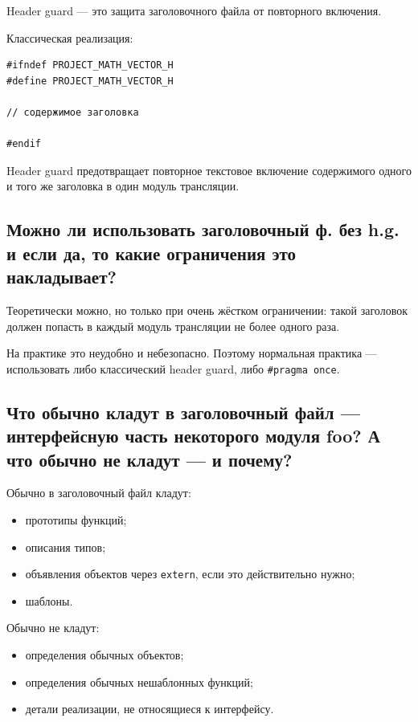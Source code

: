 \begin{definition}
Header guard --- это защита заголовочного файла от повторного включения.
\end{definition}

Классическая реализация:
\begin{verbatim}
#ifndef PROJECT_MATH_VECTOR_H
#define PROJECT_MATH_VECTOR_H

// содержимое заголовка

#endif
\end{verbatim}

Header guard предотвращает повторное текстовое включение содержимого одного и того же заголовка в один модуль трансляции.


\subsection{Можно ли использовать заголовочный ф. без h.g. и если да, то какие ограничения это накладывает?}

Теоретически можно, но только при очень жёстком ограничении: такой заголовок должен попасть в каждый модуль трансляции не более одного раза.

На практике это неудобно и небезопасно. Поэтому нормальная практика --- использовать либо классический header guard, либо \texttt{\#pragma once}.


\subsection{Что обычно кладут в заголовочный файл --- интерфейсную часть некоторого модуля foo? А что обычно не кладут --- и почему?}

Обычно в заголовочный файл кладут:
\begin{itemize}
    \item прототипы функций;
    \item описания типов;
    \item объявления объектов через \texttt{extern}, если это действительно нужно;
    \item шаблоны.
\end{itemize}

Обычно не кладут:
\begin{itemize}
    \item определения обычных объектов;
    \item определения обычных нешаблонных функций;
    \item детали реализации, не относящиеся к интерфейсу.
\end{itemize}

